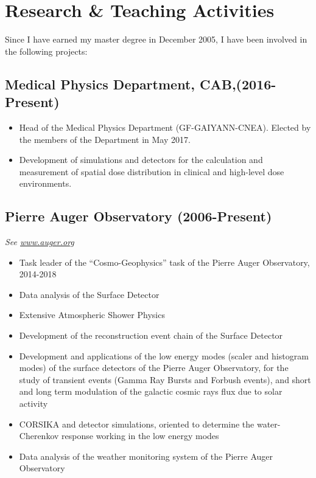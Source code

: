 \ifeng
\section*{Research \& Teaching Activities}

Since I have earned my master degree in December 2005, I have been involved in the following projects:

\subsection*{Medical Physics Department, CAB,(2016-Present)}
\begin{itemize}
	\item Head of the Medical Physics Department (GF-GAIYANN-CNEA). Elected by
		the members of the Department in May 2017.
	\item Development of simulations and detectors for the calculation and
		measurement of spatial dose distribution in clinical and high-level
		dose environments. 
\end{itemize}

\subsection*{Pierre Auger Observatory (2006-Present)}
{\small{\textit{See \href{http://www.auger.org/}{www.auger.org}}}}
\begin{itemize}
\item Task leader of the ``Cosmo-Geophysics'' task of the Pierre Auger Observatory, 2014-2018
\item Data analysis of the Surface Detector
\item Extensive Atmospheric Shower Physics
\item Development of the reconstruction event chain of the Surface Detector
\item Development and applications of the low energy modes (scaler and histogram
modes) of the surface detectors of the Pierre Auger Observatory, for the study
of transient events (Gamma Ray Bursts and Forbush events), and short and long
term modulation of the galactic cosmic rays flux due to solar activity
\item CORSIKA and detector simulations, oriented to determine the
water-Cherenkov response working in the low energy modes
\item Data analysis of the weather monitoring system of the Pierre Auger
Observatory
\end{itemize}

